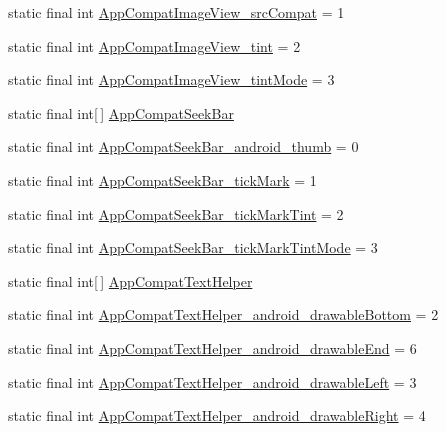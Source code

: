 \begin{CompactItemize}
\item 
static final int \hyperlink{classandroid_1_1support_1_1v4_1_1_r_1_1styleable_bc7f130ffbc0a6a871090cae86e7110f}{AppCompatImageView\_\-srcCompat} = 1
\item 
static final int \hyperlink{classandroid_1_1support_1_1v4_1_1_r_1_1styleable_5a59812d29ed00b03e0455481efa5f47}{AppCompatImageView\_\-tint} = 2
\item 
static final int \hyperlink{classandroid_1_1support_1_1v4_1_1_r_1_1styleable_335facec4026e5e7aefa8541f5121cc2}{AppCompatImageView\_\-tintMode} = 3
\item 
static final int\mbox{[}$\,$\mbox{]} \hyperlink{classandroid_1_1support_1_1v4_1_1_r_1_1styleable_7fa9b523f74ed9ed71772420c84dee04}{AppCompatSeekBar}
\item 
static final int \hyperlink{classandroid_1_1support_1_1v4_1_1_r_1_1styleable_b43c760130a04dcde39e22a8430f0e12}{AppCompatSeekBar\_\-android\_\-thumb} = 0
\item 
static final int \hyperlink{classandroid_1_1support_1_1v4_1_1_r_1_1styleable_6e0d3bf421371768beb5be26cf3f856a}{AppCompatSeekBar\_\-tickMark} = 1
\item 
static final int \hyperlink{classandroid_1_1support_1_1v4_1_1_r_1_1styleable_201e2cc7cfcab0b7c77dd7867a265808}{AppCompatSeekBar\_\-tickMarkTint} = 2
\item 
static final int \hyperlink{classandroid_1_1support_1_1v4_1_1_r_1_1styleable_768563f41000484be3e1b36b3ce945e9}{AppCompatSeekBar\_\-tickMarkTintMode} = 3
\item 
static final int\mbox{[}$\,$\mbox{]} \hyperlink{classandroid_1_1support_1_1v4_1_1_r_1_1styleable_4b08e16e18a4842ae56614fdc42afc26}{AppCompatTextHelper}
\item 
static final int \hyperlink{classandroid_1_1support_1_1v4_1_1_r_1_1styleable_e8e753980ae0cf7f493ad35506fd4eb8}{AppCompatTextHelper\_\-android\_\-drawableBottom} = 2
\item 
static final int \hyperlink{classandroid_1_1support_1_1v4_1_1_r_1_1styleable_c2187047de5b30284c00a650592eaad5}{AppCompatTextHelper\_\-android\_\-drawableEnd} = 6
\item 
static final int \hyperlink{classandroid_1_1support_1_1v4_1_1_r_1_1styleable_bc3975c5c5136d1f9f02b540cab86528}{AppCompatTextHelper\_\-android\_\-drawableLeft} = 3
\item 
static final int \hyperlink{classandroid_1_1support_1_1v4_1_1_r_1_1styleable_9f63da404fcb525c4df8b777c6ae5ce5}{AppCompatTextHelper\_\-android\_\-drawableRight} = 4

\end{CompactItemize}
